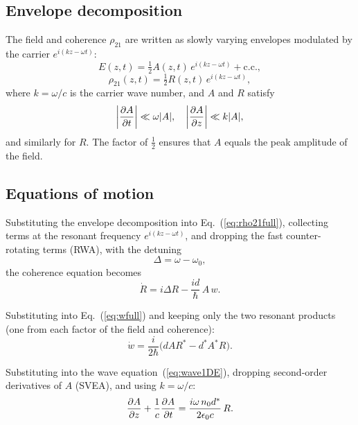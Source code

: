 \documentclass[12pt,a4paper]{article}
\begin{document}
\subsection{Envelope decomposition}

The field and coherence $\rho_{21}$ are written as slowly varying envelopes
modulated by the carrier $e^{i(kz-\omega t)}$:
\begin{equation}
  E(z,t) = \tfrac{1}{2}A(z,t)\,e^{i(kz-\omega t)} + \mathrm{c.c.},
\end{equation}
\begin{equation}
  \rho_{21}(z,t) = \tfrac{1}{2}R(z,t)\,e^{i(kz-\omega t)},
\end{equation}
where $k = \omega/c$ is the carrier wave number, and $A$ and $R$ satisfy
\begin{equation}
  \left|\dfrac{\partial A}{\partial t}\right| \ll \omega|A|,
  \quad
  \left|\dfrac{\partial A}{\partial z}\right| \ll k|A|,
\end{equation}
and similarly for $R$. The factor of $\tfrac{1}{2}$ ensures that $A$ equals
the peak amplitude of the field.

\subsection{Equations of motion}

Substituting the envelope decomposition into Eq.~(\ref{eq:rho21full}),
collecting terms at the resonant frequency $e^{i(kz-\omega t)}$,
and dropping the fast counter-rotating terms (RWA), with the detuning
\begin{equation}
  \Delta = \omega - \omega_0,
\end{equation}
the coherence equation becomes
\begin{equation}
  \dot{R} = i\Delta R - \frac{id}{\hbar}\,A\,w.
\end{equation}

Substituting into Eq.~(\ref{eq:wfull}) and keeping only the two resonant
products (one from each factor of the field and coherence):
\begin{equation}
  \dot{w} = \frac{i}{2\hbar}\bigl(dAR^* - d^*A^*R\bigr).
\end{equation}

Substituting into the wave equation~(\ref{eq:wave1DE}), dropping second-order
derivatives of $A$ (SVEA), and using $k = \omega/c$:
\begin{equation}
  \dfrac{\partial A}{\partial z} + \frac{1}{c}\dfrac{\partial A}{\partial t}
  = \frac{i\omega\,n_0 d^*}{2\epsilon_0 c}\,R.
\end{equation}
\end{document}
